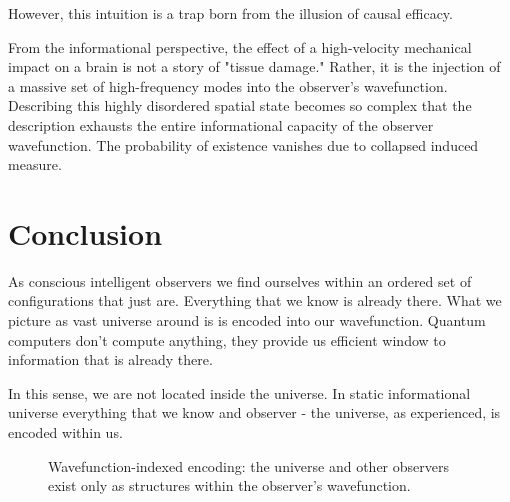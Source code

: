 However, this intuition is a trap born from the illusion of causal efficacy. 

From the informational perspective, the effect of a high-velocity mechanical impact on a brain is not a story of "tissue damage."
Rather, it is the injection of a massive set of high-frequency modes into the observer's wavefunction.
Describing this highly disordered spatial state becomes so complex that the description exhausts the entire informational capacity of the observer wavefunction. 
The probability of existence vanishes due to collapsed induced measure.


\section{Conclusion}

As conscious intelligent observers we find ourselves within an ordered set of configurations that just are. Everything
that we know is already there. What we picture as vast universe around is is encoded into our wavefunction.
Quantum computers don't compute anything, they provide us efficient window to information that is already there. 

In this sense, we are not located inside the universe.
In static informational universe everything that we know and observer - the universe, as experienced, is encoded within us. 

\begin{figure}[h]
    \centering
    \caption{Wavefunction-indexed encoding: the universe and other observers exist only as structures within the observer’s wavefunction.}
\end{figure}


